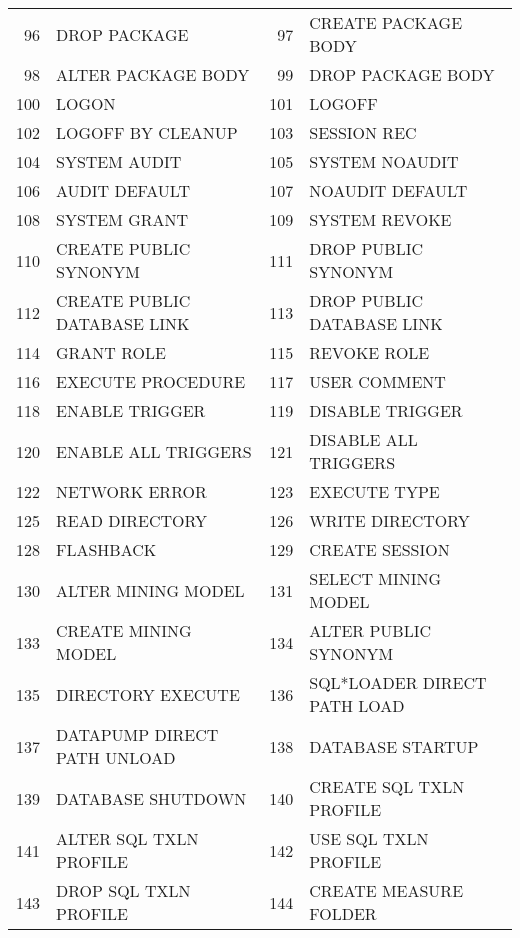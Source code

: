\begin{appendix}
\begin{longtable}[]{@{}rl|rl@{}}
96  & DROP PACKAGE                 & 97  & CREATE PACKAGE BODY          \\
98  & ALTER PACKAGE BODY           & 99  & DROP PACKAGE BODY            \\
100 & LOGON                        & 101 & LOGOFF                       \\
102 & LOGOFF BY CLEANUP            & 103 & SESSION REC                  \\
104 & SYSTEM AUDIT                 & 105 & SYSTEM NOAUDIT               \\
106 & AUDIT DEFAULT                & 107 & NOAUDIT DEFAULT              \\
108 & SYSTEM GRANT                 & 109 & SYSTEM REVOKE                \\
110 & CREATE PUBLIC SYNONYM        & 111 & DROP PUBLIC SYNONYM          \\
112 & CREATE PUBLIC DATABASE LINK  & 113 & DROP PUBLIC DATABASE LINK    \\
114 & GRANT ROLE                   & 115 & REVOKE ROLE                  \\
116 & EXECUTE PROCEDURE            & 117 & USER COMMENT                 \\
118 & ENABLE TRIGGER               & 119 & DISABLE TRIGGER              \\
120 & ENABLE ALL TRIGGERS          & 121 & DISABLE ALL TRIGGERS         \\
122 & NETWORK ERROR                & 123 & EXECUTE TYPE                 \\
125 & READ DIRECTORY               & 126 & WRITE DIRECTORY              \\
128 & FLASHBACK                    & 129 & CREATE SESSION               \\
130 & ALTER MINING MODEL           & 131 & SELECT MINING MODEL          \\
133 & CREATE MINING MODEL          & 134 & ALTER PUBLIC SYNONYM         \\
135 & DIRECTORY EXECUTE            & 136 & SQL*LOADER DIRECT PATH LOAD  \\
137 & DATAPUMP DIRECT PATH UNLOAD  & 138 & DATABASE STARTUP             \\
139 & DATABASE SHUTDOWN            & 140 & CREATE SQL TXLN PROFILE      \\
141 & ALTER SQL TXLN PROFILE       & 142 & USE SQL TXLN PROFILE         \\
143 & DROP SQL TXLN PROFILE        & 144 & CREATE MEASURE FOLDER        \\

\end{longtable}
\end{appendix}
